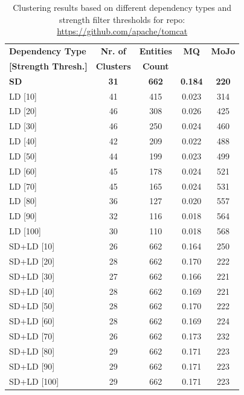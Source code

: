 \documentclass{ieeeaccess}
\begin{document}
\begin{table}
\caption{Clustering results based on different dependency types and strength filter thresholds for repo: \href{https://github.com/apache/tomcat}{https://github.com/apache/tomcat}}
\label{tab:clustering_results_tomcat}
\centering
\setlength{\tabcolsep}{3pt}
\begin{tabular}{|l|c|c|c|c|}
\hline
\textbf{Dependency Type} & \textbf{Nr. of} & \textbf{Entities} & \textbf{MQ} & \textbf{MoJo} \\
\textbf{[Strength Thresh.]} & \textbf{Clusters} & \textbf{Count} &  &  \\
\hline
\textbf{SD} & \textbf{31} & \textbf{662} & \textbf{0.184} & \textbf{220} \\
\hline
LD [10] & 41 & 415 & 0.023 & 314 \\
LD [20] & 46 & 308 & 0.026 & 425 \\
LD [30] & 46 & 250 & 0.024 & 460 \\
LD [40] & 42 & 209 & 0.022 & 488 \\
LD [50] & 44 & 199 & 0.023 & 499 \\
LD [60] & 45 & 178 & 0.024 & 521 \\
LD [70] & 45 & 165 & 0.024 & 531 \\
LD [80] & 36 & 127 & 0.020 & 557 \\
LD [90] & 32 & 116 & 0.018 & 564 \\
LD [100] & 30 & 110 & 0.018 & 568 \\
\hline
SD+LD [10] & 26 & 662 & 0.164 & 250 \\
SD+LD [20] & 28 & 662 & 0.170 & 222 \\
SD+LD [30] & 27 & 662 & 0.166 & 221 \\
SD+LD [40] & 28 & 662 & 0.169 & 221 \\
SD+LD [50] & 28 & 662 & 0.170 & 222 \\
SD+LD [60] & 28 & 662 & 0.169 & 224 \\
SD+LD [70] & 26 & 662 & 0.173 & 232 \\
SD+LD [80] & 29 & 662 & 0.171 & 223 \\
SD+LD [90] & 29 & 662 & 0.171 & 223 \\
SD+LD [100] & 29 & 662 & 0.171 & 223 \\
\hline
\end{tabular}
\end{table}
\end{document}
